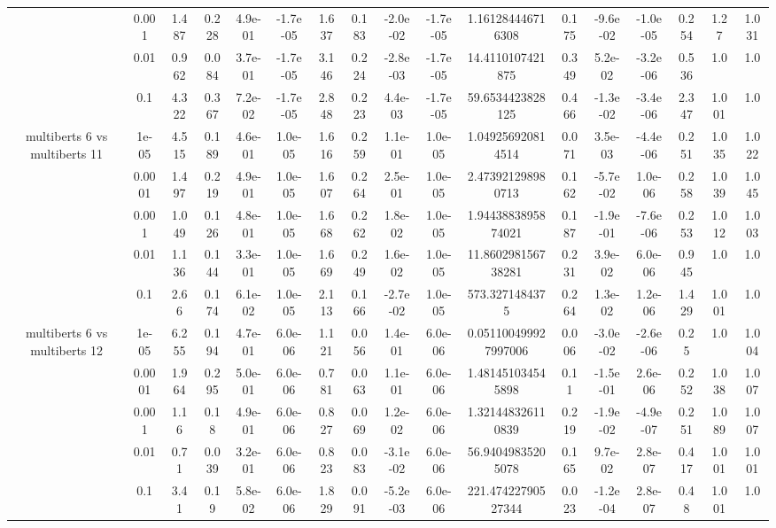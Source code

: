 \begin{tabular}{|c|c|c|c|c|c|c|c|c|c|c|c|c|c|c|c|c|}
 & 0.001 & 1.487 & 0.228 & 4.9e-01 & -1.7e-05 & 1.637 & 0.183 & -2.0e-02 & -1.7e-05 & 1.161284446716308 & 0.175 & -9.6e-02 & -1.0e-05 & 0.254 & 1.27 & 1.031 \\
 & 0.01 & 0.962 & 0.084 & 3.7e-01 & -1.7e-05 & 3.146 & 0.224 & -2.8e-03 & -1.7e-05 & 14.4110107421875 & 0.349 & 5.2e-02 & -3.2e-06 & 0.536 & 1.0 & 1.0 \\
 & 0.1 & 4.322 & 0.367 & 7.2e-02 & -1.7e-05 & 2.848 & 0.223 & 4.4e-03 & -1.7e-05 & 59.6534423828125 & 0.466 & -1.3e-02 & -3.4e-06 & 2.347 & 1.001 & 1.0 \\
\hline
\multirow{5}{*}{multiberts 6 vs multiberts 11} & 1e-05 & 4.515 & 0.189 & 4.6e-01 & 1.0e-05 & 1.616 & 0.259 & 1.1e-01 & 1.0e-05 & 1.049256920814514 & 0.071 & 3.5e-03 & -4.4e-06 & 0.251 & 1.035 & 1.022 \\
 & 0.0001 & 1.497 & 0.219 & 4.9e-01 & 1.0e-05 & 1.607 & 0.264 & 2.5e-01 & 1.0e-05 & 2.473921298980713 & 0.162 & -5.7e-02 & 1.0e-06 & 0.258 & 1.039 & 1.045 \\
 & 0.001 & 1.049 & 0.126 & 4.8e-01 & 1.0e-05 & 1.668 & 0.262 & 1.8e-02 & 1.0e-05 & 1.9443883895874021 & 0.187 & -1.9e-01 & -7.6e-06 & 0.253 & 1.012 & 1.003 \\
 & 0.01 & 1.136 & 0.144 & 3.3e-01 & 1.0e-05 & 1.669 & 0.249 & 1.6e-02 & 1.0e-05 & 11.860298156738281 & 0.231 & 3.9e-02 & 6.0e-06 & 0.945 & 1.0 & 1.0 \\
 & 0.1 & 2.66 & 0.174 & 6.1e-02 & 1.0e-05 & 2.113 & 0.166 & -2.7e-02 & 1.0e-05 & 573.3271484375 & 0.264 & 1.3e-02 & 1.2e-06 & 1.429 & 1.001 & 1.0 \\
\hline
\multirow{5}{*}{multiberts 6 vs multiberts 12} & 1e-05 & 6.255 & 0.194 & 4.7e-01 & 6.0e-06 & 1.121 & 0.056 & 1.4e-01 & 6.0e-06 & 0.051100499927997006 & 0.006 & -3.0e-02 & -2.6e-06 & 0.25 & 1.0 & 1.004 \\
 & 0.0001 & 1.964 & 0.295 & 5.0e-01 & 6.0e-06 & 0.781 & 0.063 & 1.1e-01 & 6.0e-06 & 1.481451034545898 & 0.11 & -1.5e-01 & 2.6e-06 & 0.252 & 1.038 & 1.007 \\
 & 0.001 & 1.16 & 0.18 & 4.9e-01 & 6.0e-06 & 0.827 & 0.069 & 1.2e-02 & 6.0e-06 & 1.321448326110839 & 0.219 & -1.9e-02 & -4.9e-07 & 0.251 & 1.089 & 1.007 \\
 & 0.01 & 0.71 & 0.039 & 3.2e-01 & 6.0e-06 & 0.823 & 0.083 & -3.1e-02 & 6.0e-06 & 56.94049835205078 & 0.165 & 9.7e-02 & 2.8e-07 & 0.417 & 1.001 & 1.001 \\
 & 0.1 & 3.41 & 0.19 & 5.8e-02 & 6.0e-06 & 1.829 & 0.091 & -5.2e-03 & 6.0e-06 & 221.47422790527344 & 0.023 & -1.2e-04 & 2.8e-07 & 0.48 & 1.001 & 1.0 \\

\end{tabular}
